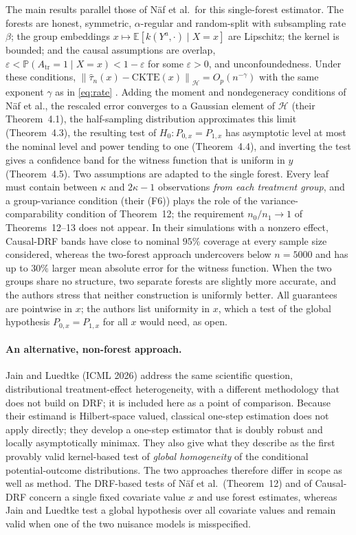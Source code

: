 \documentclass[12pt,a4paper]{article}
\newcommand{\E}{\mathbb E}
\newcommand{\Pp}{\mathbb P}
\newcommand{\calH}{\mathcal H}
\newcommand{\1}{\mathbf 1}
\newcommand{\norm}[1]{\left\lVert#1\right\rVert}
\begin{document}
The main results parallel those of N\"af et al.\ for this single-forest estimator. The forests are honest, symmetric, $\alpha$-regular and random-split with subsampling rate $\beta$; the group embeddings $x\mapsto\E[k(Y^a,\cdot)\mid X=x]$ are Lipschitz; the kernel is bounded; and the causal assumptions are overlap, $\varepsilon<\Pp(A_{\mathrm{tr}}=1\mid X=x)<1-\varepsilon$ for some $\varepsilon>0$, and unconfoundedness. Under these conditions, $\norm{\widehat\tau_n(x)-\mathrm{CKTE}(x)}_{\calH}=O_p(n^{-\gamma})$ with the same exponent $\gamma$ as in \eqref{eq:rate} \cite[Eq.~(11)]{nafpark2026}. Adding the moment and nondegeneracy conditions of N\"af et al., the rescaled error converges to a Gaussian element of $\calH$ (their Theorem~4.1), the half-sampling distribution approximates this limit (Theorem~4.3), the resulting test of $H_0:P_{0,x}=P_{1,x}$ has asymptotic level at most the nominal level and power tending to one (Theorem~4.4), and inverting the test gives a confidence band for the witness function that is uniform in $y$ (Theorem~4.5). Two assumptions are adapted to the single forest. Every leaf must contain between $\kappa$ and $2\kappa-1$ observations \emph{from each treatment group}, and a group-variance condition (their (F6)) plays the role of the variance-comparability condition of Theorem~12; the requirement $n_0/n_1\to1$ of Theorems~12--13 does not appear. In their simulations with a nonzero effect, Causal-DRF bands have close to nominal $95\%$ coverage at every sample size considered, whereas the two-forest approach undercovers below $n=5000$ and has up to $30\%$ larger mean absolute error for the witness function. When the two groups share no structure, two separate forests are slightly more accurate, and the authors stress that neither construction is uniformly better. All guarantees are pointwise in $x$; the authors list uniformity in $x$, which a test of the global hypothesis $P_{0,x}=P_{1,x}$ for all $x$ would need, as open.

\paragraph{An alternative, non-forest approach.}
Jain and Luedtke \cite{jainluedtke2026} (ICML 2026) address the same scientific question, distributional treatment-effect heterogeneity, with a different methodology that does not build on DRF; it is included here as a point of comparison. Because their estimand is Hilbert-space valued, classical one-step estimation does not apply directly; they develop a one-step estimator that is doubly robust and locally asymptotically minimax. They also give what they describe as the first provably valid kernel-based test of \emph{global homogeneity} of the conditional potential-outcome distributions. The two approaches therefore differ in scope as well as method. The DRF-based tests of N\"af et al.\ (Theorem~12) and of Causal-DRF concern a single fixed covariate value $x$ and use forest estimates, whereas Jain and Luedtke test a global hypothesis over all covariate values and remain valid when one of the two nuisance models is misspecified.
\end{document}
